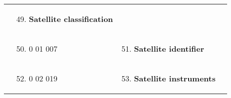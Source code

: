 \begin{longtable}[]{@{}llll@{}}
\begin{minipage}[t]{0.22\columnwidth}
\end{minipage} & \begin{minipage}[t]{0.22\columnwidth}\raggedright
\begin{enumerate}
\setcounter{enumi}{48}
\item
  \textbf{Satellite classification}
\end{enumerate}\strut
\end{minipage} & \begin{minipage}[t]{0.22\columnwidth}\raggedright
\strut
\end{minipage}\tabularnewline
\begin{minipage}[t]{0.22\columnwidth}\raggedright
\strut
\end{minipage} & \begin{minipage}[t]{0.22\columnwidth}\raggedright
\begin{enumerate}
\setcounter{enumi}{49}
\item
  0 01 007
\end{enumerate}\strut
\end{minipage} & \begin{minipage}[t]{0.22\columnwidth}\raggedright
\begin{enumerate}
\setcounter{enumi}{50}
\item
  \textbf{Satellite identifier}
\end{enumerate}\strut
\end{minipage} & \begin{minipage}[t]{0.22\columnwidth}\raggedright
\strut
\end{minipage}\tabularnewline
\begin{minipage}[t]{0.22\columnwidth}\raggedright
\strut
\end{minipage} & \begin{minipage}[t]{0.22\columnwidth}\raggedright
\begin{enumerate}
\setcounter{enumi}{51}
\item
  0 02 019
\end{enumerate}\strut
\end{minipage} & \begin{minipage}[t]{0.22\columnwidth}\raggedright
\begin{enumerate}
\setcounter{enumi}{52}
\item
  \textbf{Satellite instruments}
\end{enumerate}\strut
\end{minipage} & \begin{minipage}[t]{0.22\columnwidth}\raggedright
\strut
\end{minipage}\tabularnewline

\end{longtable}
